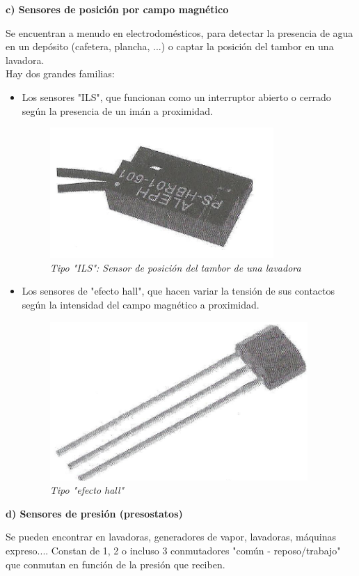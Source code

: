 \documentclass[a5paper,twoside,openany]{book}
\begin{document}
\newpage
\begin{center}
\textbf{c) Sensores de posición por campo magnético}
\end{center}
Se encuentran a menudo en electrodomésticos, para detectar la presencia de agua en un depósito (cafetera, plancha, ...) o captar la posición del tambor en una lavadora.\\


Hay dos grandes familias:

\begin{itemize}
\item Los sensores "ILS", que funcionan como un interruptor abierto o cerrado según la presencia de un imán a proximidad.

\begin{figure}[h]
\centering
\includegraphics[width=0.6\linewidth]{sensor-ILS}
\caption*{\textit{Tipo "ILS": Sensor de posición del tambor de una lavadora}}
\end{figure}

\item Los sensores de "efecto hall", que hacen variar la tensión de sus contactos según la intensidad del campo magnético a proximidad.

\begin{figure}[h]
\centering
\includegraphics[width=0.6\linewidth]{sensor-hall}
\caption*{\textit{Tipo "efecto hall"}}
\end{figure}

\end{itemize}
\newpage 

\begin{center}
\textbf{d) Sensores de presión (presostatos)}
\end{center}
Se pueden encontrar en lavadoras, generadores de vapor, lavadoras, máquinas expreso.... Constan de 1, 2 o incluso 3 conmutadores "común - reposo/trabajo" que conmutan en función de la presión que reciben.
\end{document}
